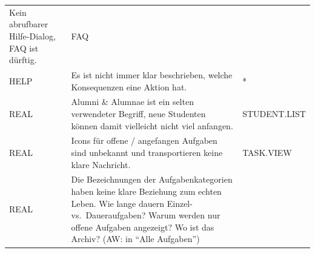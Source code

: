 \documentclass[
  12pt,
  ngerman,
  a4paper,
]{article}
\begin{document}
\begin{longtable}[]{@{}lll@{}}
\begin{minipage}[t]{0.52\columnwidth}
Kein abrufbarer Hilfe-Dialog, FAQ ist dürftig.\strut
\end{minipage} & \begin{minipage}[t]{0.17\columnwidth}\raggedright
FAQ\strut
\end{minipage}\tabularnewline
\begin{minipage}[t]{0.22\columnwidth}\raggedright
HELP\strut
\end{minipage} & \begin{minipage}[t]{0.52\columnwidth}\raggedright
Es ist nicht immer klar beschrieben, welche Konsequenzen eine Aktion
hat.\strut
\end{minipage} & \begin{minipage}[t]{0.17\columnwidth}\raggedright
*\strut
\end{minipage}\tabularnewline
\begin{minipage}[t]{0.22\columnwidth}\raggedright
REAL\strut
\end{minipage} & \begin{minipage}[t]{0.52\columnwidth}\raggedright
Alumni \& Alumnae ist ein selten verwendeter Begriff, neue Studenten
können damit vielleicht nicht viel anfangen.\strut
\end{minipage} & \begin{minipage}[t]{0.17\columnwidth}\raggedright
STUDENT.LIST\strut
\end{minipage}\tabularnewline
\begin{minipage}[t]{0.22\columnwidth}\raggedright
REAL\strut
\end{minipage} & \begin{minipage}[t]{0.52\columnwidth}\raggedright
Icons für offene / angefangen Aufgaben sind unbekannt und transportieren
keine klare Nachricht.\strut
\end{minipage} & \begin{minipage}[t]{0.17\columnwidth}\raggedright
TASK.VIEW\strut
\end{minipage}\tabularnewline
\begin{minipage}[t]{0.22\columnwidth}\raggedright
REAL\strut
\end{minipage} & \begin{minipage}[t]{0.52\columnwidth}\raggedright
Die Bezeichnungen der Aufgabenkategorien haben keine klare Beziehung zum
echten Leben. Wie lange dauern Einzel- vs.~Daueraufgaben? Warum werden
nur offene Aufgaben angezeigt? Wo ist das Archiv? (AW: in ``Alle
Aufgaben'')\strut
\end{minipage} & \begin{minipage}[t]{0.17\columnwidth}\raggedright

\end{minipage}
\end{longtable}
\end{document}
